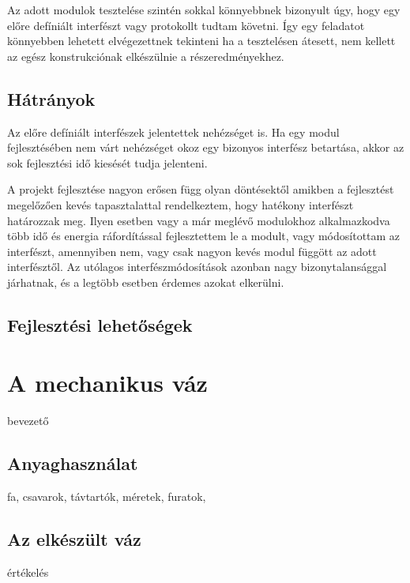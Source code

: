 Az adott modulok tesztelése szintén sokkal könnyebbnek bizonyult úgy, hogy egy
előre defíniált interfészt vagy protokollt tudtam követni. Így egy feladatot
könnyebben lehetett elvégezettnek tekinteni ha a tesztelésen átesett, nem kellett
az egész konstrukciónak elkészülnie a részeredményekhez. 

\subsection{Hátrányok}

Az előre defíniált interfészek jelentettek nehézséget is. Ha egy modul
fejlesztésében nem várt nehézséget okoz egy bizonyos interfész betartása, akkor
az sok fejlesztési idő kiesését tudja jelenteni.

A projekt fejlesztése nagyon erősen függ olyan döntésektől amikben a fejlesztést
megelőzően kevés tapasztalattal rendelkeztem, hogy hatékony interfészt határozzak
meg. Ilyen esetben vagy a már meglévő modulokhoz alkalmazkodva több idő és
energia ráfordítással fejlesztettem le a modult, vagy módosítottam az interfészt,
amennyiben nem, vagy csak nagyon kevés modul függött az adott interfésztől. Az
utólagos interfészmódosítások azonban nagy bizonytalansággal járhatnak, és a
legtöbb esetben érdemes azokat elkerülni.

\subsection{Fejlesztési lehetőségek}




\section{A mechanikus váz}

bevezető

\subsection{Anyaghasználat}

fa, csavarok, távtartók, méretek, furatok,

\subsection{Az elkészült váz}

értékelés

